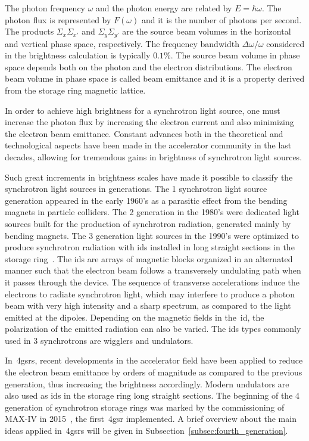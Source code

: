 The photon frequency $\omega$ and the photon energy are related by $E = \hbar \omega$. The photon flux is represented by $F(\omega)$ and it is the number of photons per second. The products $\Sigma_x \Sigma_{x'}$ and $\Sigma_y\Sigma_{y'}$ are the source beam volumes in the horizontal and vertical phase space, respectively. The frequency bandwidth $\Delta \omega/\omega$ considered in the brightness calculation is typically $0.1\%$. The source beam volume in phase space depends both on the photon and the electron distributions. The electron beam volume in phase space is called beam emittance and it is a property derived from the storage ring magnetic lattice.

In order to achieve high brightness for a synchrotron light source, one must increase the photon flux by increasing the electron current and also minimizing the electron beam emittance. Constant advances both in the theoretical and technological aspects have been made in the accelerator community in the last decades, allowing for tremendous gains in brightness of synchrotron light sources\cite{eriksson, liu2017}. 

Such great increments in brightness scales have made it possible to classify the synchrotron light sources in generations. The 1 synchrotron light source generation appeared in the early 1960's as a parasitic effect from the bending magnets in particle colliders. The 2 generation in the 1980's were dedicated light sources built for the production of synchrotron radiation, generated mainly by bending magnets. The 3 generation light sources in the 1990's were optimized to produce synchrotron radiation with \glspl{id} installed in long straight sections in the storage ring~\cite{liu2017}. The \glspl{id} are arrays of magnetic blocks organized in an alternated manner such that the electron beam follows a transversely undulating path when it passes through the device. The sequence of transverse accelerations induce the electrons to radiate synchrotron light, which may interfere to produce a photon beam with very high intensity and a sharp spectrum, as compared to the light emitted at the dipoles. Depending on the magnetic fields in the~\gls{id}, the polarization of the emitted radiation can also be varied. The \glspl{id} types commonly used in 3 synchrotrons are wigglers and undulators.

In~\glspl{4gsr}, recent developments in the accelerator field have been applied to reduce the electron beam emittance by orders of magnitude as compared to the previous generation, thus increasing the brightness accordingly. Modern undulators are also used as \glspl{id} in the storage ring long straight sections. The beginning of the 4 generation of synchrotron storage rings was marked by the commissioning of MAX-IV in 2015~\cite{eriksson2016}, the first~\gls{4gsr} implemented. A brief overview about the main ideas applied in~\glspl{4gsr} will be given in Subsection~\ref{subsec:fourth_generation}.
